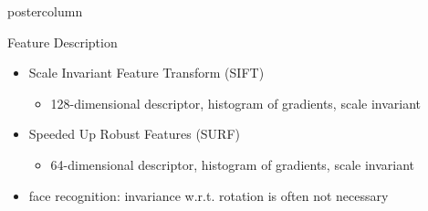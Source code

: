 \documentclass[final,hyperref={pdfpagelabels=false}]{beamer}
\begin{document}
\begin{frame}
\begin{columns}
\begin{column}{.49\textwidth}
\begin{beamercolorbox}[center,wd=\textwidth]{postercolumn}
\begin{minipage}[T]{.95\textwidth}
{
            \vfill
            \begin{block}{Feature Description}
              \begin{itemize}
              \item Scale Invariant Feature Transform (SIFT)
                \begin{itemize}
                \item 128-dimensional descriptor, histogram of gradients, scale invariant
                \end{itemize}
              \item Speeded Up Robust Features (SURF)
                \begin{itemize}
                \item 64-dimensional descriptor, histogram of gradients, scale invariant
                \end{itemize}
              \item face recognition: invariance w.r.t. rotation is often not necessary

\end{itemize}
\end{block}}
\end{minipage}
\end{beamercolorbox}
\end{column}
\end{columns}
\end{frame}
\end{document}
